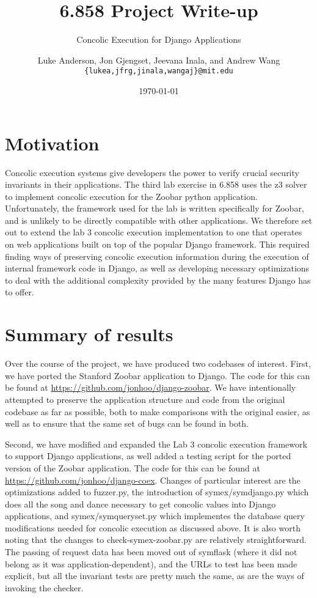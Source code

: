 \documentclass{scrartcl}
\author{Luke Anderson, Jon Gjengset, Jeevana Inala, and Andrew Wang \\
	\texttt{\{lukea,jfrg,jinala,wangaj\}@mit.edu}
}
\title{6.858 Project Write-up}
\subtitle{Concolic Execution for Django Applications}
\date{\today}
\begin{document}
\maketitle

\section{Motivation}
Concolic execution systems give developers the power to verify crucial security
invariants in their applications. The third lab exercise in 6.858 uses the z3
solver to implement concolic execution for the Zoobar python application.
Unfortunately, the framework used for the lab is written specifically for
Zoobar, and is unlikely to be directly compatible with other applications. We
therefore set out to extend the lab 3 concolic execution implementation to one
that operates on web applications built on top of the popular Django framework.
This required finding ways of preserving concolic execution information during
the execution of internal framework code in Django, as well as developing
necessary optimizations to deal with the additional complexity provided by the
many features Django has to offer.

\section{Summary of results}
Over the course of the project, we have produced two codebases of interest.
First, we have ported the Stanford Zoobar application to Django. The code for
this can be found at \url{https://github.com/jonhoo/django-zoobar}. We have
intentionally attempted to preserve the application structure and code from the
original codebase as far as possible, both to make comparisons with the
original easier, as well as to ensure that the same set of bugs can be found in
both.

Second, we have modified and expanded the Lab 3 concolic execution framework to
support Django applications, as well added a testing script for the ported
version of the Zoobar application. The code for this can be found at
\url{https://github.com/jonhoo/django-coex}. Changes of particular interest are
the optimizations added to fuzzer.py, the introduction of symex/symdjango.py
which does all the song and dance necessary to get concolic values into Django
applications, and symex/symqueryset.py which implementes the database query
modifications needed for concolic execution as discussed above. It is also
worth noting that the changes to check-symex-zoobar.py are relatively
straightforward. The passing of request data has been moved out of symflask
(where it did not belong as it was application-dependent), and the URLs to test
has been made explicit, but all the invariant tests are pretty much the same,
as are the ways of invoking the checker.
\end{document}
